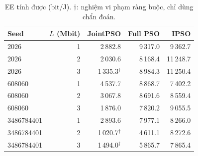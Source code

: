 \begin{table}
\centering
\renewcommand{\arraystretch}{1.16}
\setlength{\tabcolsep}{5pt}
\begin{tabular}{lrrrr}
\toprule
Seed & $L$ (Mbit) & JointPSO & Full PSO & IPSO \\
\midrule
2026 & 1 & 2\,882.8 & 9\,317.0 & 9\,362.7 \\
2026 & 2 & 2\,030.6 & 8\,168.4 & 11\,248.7 \\
2026 & 3 & 1\,335.3$^{\dagger}$ & 8\,984.3 & 11\,250.4 \\
608060 & 1 & 4\,537.7 & 8\,868.7 & 7\,402.2 \\
608060 & 2 & 3\,067.8 & 8\,691.6 & 8\,559.4 \\
608060 & 3 & 1\,876.0 & 7\,820.2 & 9\,055.5 \\
3486784401 & 1 & 2\,893.6 & 7\,977.1 & 8\,266.0 \\
3486784401 & 2 & 1\,020.7$^{\dagger}$ & 4\,611.1 & 8\,272.6 \\
3486784401 & 3 & 1\,494.0$^{\dagger}$ & 5\,865.7 & 7\,865.4 \\
\bottomrule
\end{tabular}
\caption{EE tính được (bit/J). $\dagger$: nghiệm vi phạm ràng buộc, chỉ dùng chẩn đoán.}
\end{table}
